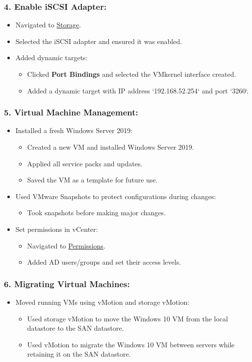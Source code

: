 \documentclass[letterpaper]{article}
\begin{document}
\subsubsection{4. Enable iSCSI Adapter:}
\label{sec:orgd3e0632}
\begin{itemize}
\item Navigated to \uline{Storage}.
\item Selected the iSCSI adapter and ensured it was enabled.
\item Added dynamic targets:
\begin{itemize}
\item Clicked \textbf{Port Bindings} and selected the VMkernel interface created.
\item Added a dynamic target with IP address `192.168.52.254` and port `3260`.
\end{itemize}
\end{itemize}

\subsubsection{5. Virtual Machine Management:}
\label{sec:orge94c2e1}
\begin{itemize}
\item Installed a fresh Windows Server 2019:
\begin{itemize}
\item Created a new VM and installed Windows Server 2019.
\item Applied all service packs and updates.
\item Saved the VM as a template for future use.
\end{itemize}
\item Used VMware Snapshots to protect configurations during changes:
\begin{itemize}
\item Took snapshots before making major changes.
\end{itemize}
\item Set permissions in vCenter:
\begin{itemize}
\item Navigated to \uline{Permissions}.
\item Added AD users/groups and set their access levels.
\end{itemize}
\end{itemize}

\subsubsection{6. Migrating Virtual Machines:}
\label{sec:orgb4c7c7f}
\begin{itemize}
\item Moved running VMs using vMotion and storage vMotion:
\begin{itemize}
\item Used storage vMotion to move the Windows 10 VM from the local datastore to the SAN datastore.
\item Used vMotion to migrate the Windows 10 VM between servers while retaining it on the SAN datastore.
\end{itemize}
\end{itemize}
\end{document}
